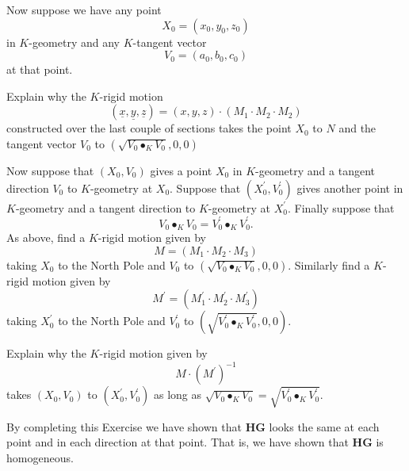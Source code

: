 \documentclass{ximera}
\begin{document}
Now suppose we have any point%
\[
X_{0}=\left(  x_{0},y_{0},z_{0}\right)
\]
in $K$-geometry and any $K$-tangent vector%
\[
V_{0}=\left(  a_{0},b_{0},c_{0}\right)
\]
at that point.

\begin{exercise}
Explain why the $K$-rigid motion%
\[
\left(  \underline{x},\underline{y},\underline{z}\right)  =\left(
x,y,z\right)  \cdot\left(  M_{1}\cdot M_{2}\cdot M_{2}\right)
\]
constructed over the last couple of sections takes the point $X_{0}$ to $N$
and the tangent vector $V_{0}$ to $\left(  \sqrt{V_{0}\bullet_{K}V_{0}%
},0,0\right)  $
\end{exercise}

Now suppose that $\left(  X_{0},V_{0}\right)  $ gives a point $X_{0}$ in
$K$-geometry and a tangent direction $V_{0}$ to $K$-geometry at $X_{0}$.
Suppose that $\left(  X_{0}^{\prime},V_{0}^{\prime}\right)  $ gives another
point in $K$-geometry and a tangent direction to $K$-geometry at
$X_{0}^{\prime}$. Finally suppose that%
\[
V_{0}\bullet_{K}V_{0}=V_{0}^{\prime}\bullet_{K}V_{0}^{\prime}.
\]
As above, find a $K$-rigid motion given by%
\[
M=\left(  M_{1}\cdot M_{2}\cdot M_{3}\right)
\]
taking $X_{0}$ to the North Pole and $V_{0}$ to $\left(  \sqrt{V_{0}%
\bullet_{K}V_{0}},0,0\right)  $. Similarly find a $K$-rigid motion given by%
\[
M^{\prime}=\left(  M_{1}^{\prime}\cdot M_{2}^{\prime}\cdot M_{3}^{\prime
}\right)
\]
taking $X_{0}^{\prime}$ to the North Pole and $V_{0}^{\prime}$ to $\left(
\sqrt{V_{0}^{\prime}\bullet_{K}V_{0}^{\prime}},0,0\right)  .$

\begin{exercise}
Explain why the $K$-rigid motion given by%
\[
M\cdot\left(  M^{\prime}\right)  ^{-1}%
\]
takes $\left(  X_{0},V_{0}\right)  $ to $\left(  X_{0}^{\prime},V_{0}^{\prime
}\right)  $ as long as $\sqrt{V_{0}\bullet_{K}V_{0}}=\sqrt{V_{0}^{\prime
}\bullet_{K}V_{0}^{\prime}}$.
\end{exercise}

By completing this Exercise we have shown that \textbf{HG} looks the
same at each point and in each direction at that point. That is, we
have shown that \textbf{HG} is homogeneous.
\end{document}
